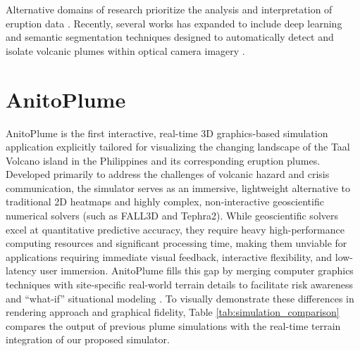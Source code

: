 Alternative domains of research prioritize the analysis and interpretation of eruption data \cite{Pardini2024}. 
Recently, several works has expanded to include deep learning and semantic segmentation techniques designed to automatically detect and isolate volcanic plumes within optical camera imagery \cite{Wilkes2022, GuerreroTello2022, Torrisi2024, Swetha2023}.

\section{AnitoPlume}
AnitoPlume is the first interactive, real-time 3D graphics-based simulation application explicitly tailored for visualizing the changing landscape of the Taal Volcano island in the Philippines and its corresponding eruption plumes.
Developed primarily to address the challenges of volcanic hazard and crisis communication, the simulator serves as an immersive, lightweight alternative to traditional 2D heatmaps and highly complex, non-interactive geoscientific numerical solvers (such as FALL3D and Tephra2).
While geoscientific solvers excel at quantitative predictive accuracy, they require heavy high-performance computing resources and significant processing time, making them unviable for applications requiring immediate visual feedback, interactive flexibility, and low-latency user immersion.
AnitoPlume fills this gap by merging computer graphics techniques with site-specific real-world terrain details to facilitate risk awareness and ``what-if'' situational modeling \cite{del2026interactive}. 
To visually demonstrate these differences in rendering approach and graphical fidelity, Table \ref{tab:simulation_comparison} compares the output of previous plume simulations with the real-time terrain integration of our proposed simulator.

